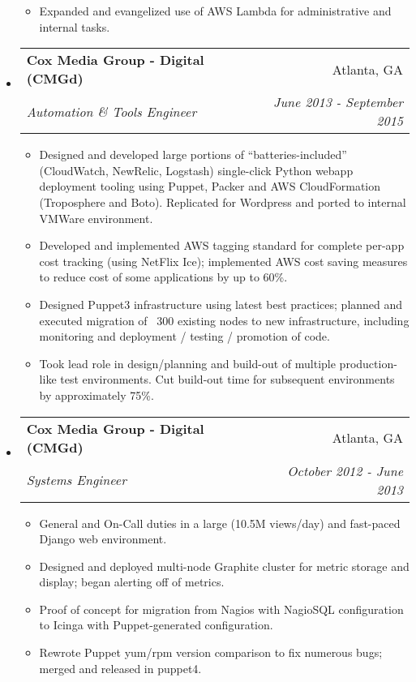 \documentclass[letterpaper,11pt]{article}
\makeatletter
\newcommand{\resitem}[1]{\item #1 \vspace{-2pt}}
\newcommand{\ressubheading}[4]{
\begin{tabular*}{7.0in}{l@{\extracolsep{\fill}}r}
		\textbf{#1} & #2 \\
		\textit{#3} & \textit{#4} \\
\end{tabular*}\vspace{-6pt}}
\makeatother
\begin{document}
\begin{itemize}
\begin{itemize}
								\resitem{Expanded and evangelized use of AWS Lambda for administrative and internal tasks.}
	\end{itemize}
\item
	\ressubheading{Cox Media Group - Digital (CMGd)}{Atlanta, GA}{Automation \& Tools Engineer}{June 2013 - September 2015}
	\begin{itemize}
                \resitem{Designed and developed large portions of ``batteries-included'' (CloudWatch, NewRelic, Logstash) single-click Python webapp deployment tooling using Puppet, Packer and AWS CloudFormation (Troposphere and Boto). Replicated for Wordpress and ported to internal VMWare environment.}
                \resitem{Developed and implemented AWS tagging standard for complete per-app cost tracking (using NetFlix Ice); implemented AWS cost saving measures to reduce cost of some applications by up to 60\%.}
                \resitem{Designed Puppet3 infrastructure using latest best practices; planned and executed migration of ~300 existing nodes to new infrastructure, including monitoring and deployment / testing / promotion of code.}
                \resitem{Took lead role in design/planning and build-out of multiple production-like test environments. Cut build-out time for subsequent environments by approximately 75\%.}
	\end{itemize}

\item
	\ressubheading{Cox Media Group - Digital (CMGd)}{Atlanta, GA}{Systems Engineer}{October 2012 - June 2013}
	\begin{itemize}
                \resitem{General and On-Call duties in a large (10.5M views/day) and fast-paced Django web environment.}
                \resitem{Designed and deployed multi-node Graphite cluster for metric storage and display; began alerting off of metrics.}
                \resitem{Proof of concept for migration from Nagios with NagioSQL configuration to Icinga with Puppet-generated configuration.}
                \resitem{Rewrote Puppet yum/rpm version comparison to fix numerous bugs; merged and released in puppet4.}
	\end{itemize}


\end{itemize}
\end{document}
